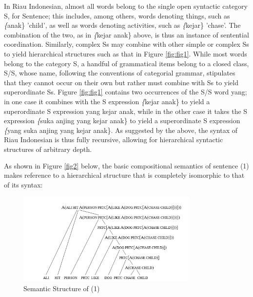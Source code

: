 \documentclass[output=paper,colorlinks,citecolor=brown
]{langscibook}
\begin{document}
In Riau Indonesian, almost all words belong to the single open syntactic category S, for Sentence; this includes, among others, words denoting things, such as \emph\{anak\} 'child', as well as words denoting activities, such as \emph\{kejar\} 'chase'. The combination of the two, as in \emph\{kejar anak\} above, is thus an instance of sentential coordination. Similarly, complex Ss may combine with other simple or complex Ss to yield hierarchical structures such as that in Figure \ref{fig:fig1}. While most words belong to the category S, a handful of grammatical items belong to a closed class, S/S, whose name, following the conventions of categorial grammar, stipulates that they cannot occur on their own but rather must combine with Ss to yield superordinate Ss. Figure \ref{fig:fig1} contains two occurrences of the S/S word yang; in one case it combines with the S expression \emph\{kejar anak\} to yield a superordinate S expression yang kejar anak, while in the other case it takes the S expression \emph\{suka anjing yang kejar anak\} to yield a superordinate S expression \emph\{yang suka anjing yang kejar anak\}. As suggested by the above, the syntax of Riau Indonesian is thus fully recursive, allowing for hierarchical syntactic structures of arbitrary depth.

As shown in Figure \ref{fig2} below, the basic compositional semantics of sentence (1) makes reference to a hierarchical structure that is completely isomorphic to that of its syntax:

\begin{figure}[hbt!]
\centering
\includegraphics[width=0.8\textwidth]{gil_figure2.png}
\caption{\label{fig:fig2}Semantic Structure of (1)}
\end{figure}
\end{document}
